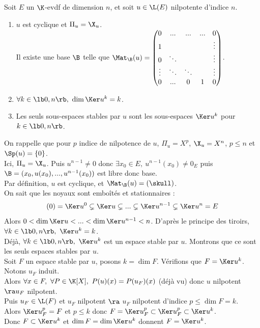 \documentclass[11pt]{article}
\begin{document}
\begin{prop}{}{}
    Soit $E$ un $\K$-evdf de dimension $n$, et soit $u\in\L(E)$ nilpotente d'indice $n$.
    \begin{enumerate}
        \item $u$ est cyclique et $\Pi_u = \X_u$.\\
        Il existe une base $\B$ telle que $\Mat_\B(u)=\begin{pmatrix}0&...&...&...&0\\ 1 & & & & \vdots \\ 0 & \ddots & & & \vdots \\ \vdots & \ddots & \ddots & & \vdots \\ 0 & ... & 0 & 1 & 0 \end{pmatrix}$.
        \item $\forall k \in \lb0,n\rb, ~ \dim\Ker u^k=k$.
        \item Les seuls sous-espaces stables par $u$ sont les sous-espaces $\Ker u^k$ pour $k\in\lb0,n\rb$.
    \end{enumerate}
    \tcblower
     On rappelle que pour $p$ indice de nilpotence de $u$, $\Pi_u=X^p$, $\X_u=X^n$, $p\leq n$ et $\Sp(u)=\{0\}$.\\
    Ici, $\Pi_u=\X_u$. Puis $u^{n-1}\neq0$ donc $\exists x_0 \in E, ~ u^{n-1}(x_0)\neq0_E$ puis $\B=(x_0,u(x_0),...,u^{n-1}(x_0))$ est libre donc base.\\
    Par définition, $u$ est cyclique, et $\Mat_\B(u)=(\skull)$.\\
     On sait que les noyaux sont emboîtés et stationnaires :
    \begin{equation*}
        (0) = \Ker u^0 \subsetneq \Ker u \subsetneq ... \subsetneq \Ker u^{n-1} \subsetneq \Ker u^n = E
    \end{equation*}
    Alors $0<\dim \Ker u < ... < \dim \Ker u^{n-1} < n$. D'après le principe des tiroirs, $\forall k \in \lb0,n\rb, ~ \Ker u^k = k$.\\
     Déjà, $\forall k \in \lb0,n\rb, ~ \Ker u^k$ est un espace stable par $u$. Montrons que ce sont les seuls espaces stables par $u$.\\
    Soit $F$ un espace stable par $u$, posons $k=\dim F$. Vérifions que $F=\Ker u^k$. Notons $u_F$ induit.\\
    Alors $\forall x \in F, ~ \forall P \in \K[X], ~ P(u)(x)=P(u_F)(x)$ (déjà vu) donc $u$ nilpotent $\ra u_F$ nilpotent.\\
    Puis $u_F \in \L(F)$ et $u_F$ nilpotent $\ra$ $u_F$ nilpotent d'indice $p\leq \dim F = k$.\\
    Alors $\Ker u_F^p = F$ et $p\leq k$ donc $F=\Ker u_F^p \subset \Ker u_F^p \subset \Ker u^k$.\\
    Donc $F\subset \Ker u^k$ et $\dim F = \dim \Ker u^k$ donnent $F=\Ker u^k$.
\end{prop}
\end{document}

